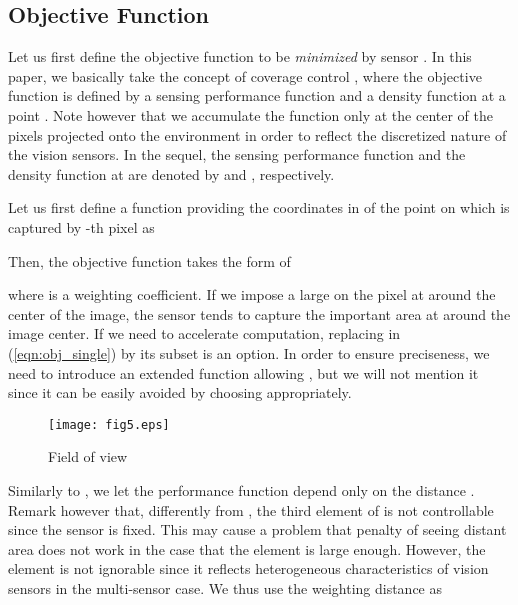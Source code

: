\documentclass[conference,letterpaper]{ieeeconf}
\begin{document}
\subsection{Objective Function}



Let us first define the objective function
to be {\it minimized} by sensor .
In this paper, we basically take the concept of coverage control \cite{CL_EJC05,BCM_BK09}, 
where the objective function is defined by 
a sensing performance function and a density function at 
a point .
Note however that
we accumulate the function only at the center of the pixels
projected onto the environment  in order to reflect
the discretized nature of the vision sensors.
In the sequel, the sensing performance function and the density function
at  are denoted by
 and 
, respectively.









Let us first define a function  
providing the coordinates in  of the point on 
which is captured by -th pixel as

Then, the objective function takes the form of

where  is a weighting coefficient.
If we impose a large  on the pixel at around the center of the image,
the sensor tends to capture the important area at around the image center.
If we need to accelerate computation, 
replacing  in (\ref{eqn:obj_single}) by its subset
is an option.
In order to ensure preciseness, we need to introduce an extended function
allowing , but we will not mention it
since it can be easily avoided by choosing
 appropriately.



\begin{figure}[t]
\begin{center}
\texttt{[image: fig5.eps]}
\caption{Field of view }
\label{fig:FOV2}
\end{center}
\end{figure}



Similarly to \cite{BCM_BK09}, we let
the performance function  depend only on the distance .
Remark however that, differently from \cite{BCM_BK09}, 
the third element of  is not controllable
since the sensor is fixed.
This may cause a problem that penalty of seeing distant area
does not work in the case that the element is large enough.
However, the element is not ignorable since it reflects heterogeneous 
characteristics of vision sensors in the multi-sensor case.
We thus use the weighting distance as
\end{document}
